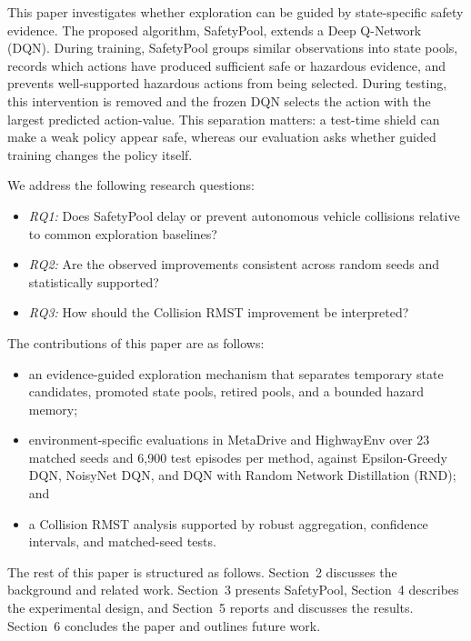 \documentclass[runningheads]{llncs}
\begin{document}
This paper investigates whether exploration can be guided by state-specific safety evidence. The proposed algorithm, SafetyPool, extends a Deep Q-Network (DQN). During training, SafetyPool groups similar observations into state pools, records which actions have produced sufficient safe or hazardous evidence, and prevents well-supported hazardous actions from being selected. During testing, this intervention is removed and the frozen DQN selects the action with the largest predicted action-value. This separation matters: a test-time shield can make a weak policy appear safe, whereas our evaluation asks whether guided training changes the policy itself.

We address the following research questions:

\begin{itemize}[leftmargin=1.8em,labelindent=0pt,labelsep=0.5em,itemsep=0.25em,topsep=0.25em]
\item \textit{RQ1:} Does SafetyPool delay or prevent autonomous vehicle collisions relative to common exploration baselines?
\item \textit{RQ2:} Are the observed improvements consistent across random seeds and statistically supported?
\item \textit{RQ3:} How should the Collision RMST improvement be interpreted?
\end{itemize}

The contributions of this paper are as follows:

\begin{itemize}[leftmargin=*]
\item an evidence-guided exploration mechanism that separates temporary state candidates, promoted state pools, retired pools, and a bounded hazard memory;
\item environment-specific evaluations in MetaDrive and HighwayEnv over 23 matched seeds and 6,900 test episodes per method, against Epsilon-Greedy DQN, NoisyNet DQN, and DQN with Random Network Distillation (RND); and
\item a Collision RMST analysis supported by robust aggregation, confidence intervals, and matched-seed tests.
\end{itemize}

The rest of this paper is structured as follows. Section~2 discusses the background and related work. Section~3 presents SafetyPool, Section~4 describes the experimental design, and Section~5 reports and discusses the results. Section~6 concludes the paper and outlines future work.
\end{document}
